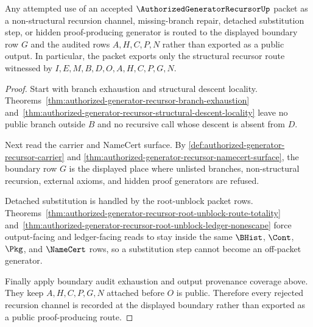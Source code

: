 \begin{theorem}
\label{thm:authorized-generator-recursor-recursion-channel-refusal}
Any attempted use of an accepted $\AuthorizedGeneratorRecursorUp$ packet as a non-structural recursion channel, missing-branch repair, detached substitution step, or hidden proof-producing generator is routed to the displayed boundary row $G$ and the audited rows $A,H,C,P,N$ rather than exported as a public output. In particular, the packet exports only the structural recursor route witnessed by $I,E,M,B,D,O,A,H,C,P,G,N$.
\end{theorem}
\begin{proof}
Start with branch exhaustion and structural descent locality. Theorems~\ref{thm:authorized-generator-recursor-branch-exhaustion} and~\ref{thm:authorized-generator-recursor-structural-descent-locality} leave no public branch outside $B$ and no recursive call whose descent is absent from $D$.

Next read the carrier and NameCert surface. By \autoref{def:authorized-generator-recursor-carrier} and \autoref{thm:authorized-generator-recursor-namecert-surface}, the boundary row $G$ is the displayed place where unlisted branches, non-structural recursion, external axioms, and hidden proof generators are refused.

Detached substitution is handled by the root-unblock packet rows. Theorems~\ref{thm:authorized-generator-recursor-root-unblock-route-totality} and~\ref{thm:authorized-generator-recursor-root-unblock-ledger-nonescape} force output-facing and ledger-facing reads to stay inside the same $\BHist$, $\Cont$, $\Pkg$, and $\NameCert$ rows, so a substitution step cannot become an off-packet generator.

Finally apply boundary audit exhaustion and output provenance coverage above. They keep $A,H,C,P,G,N$ attached before $O$ is public. Therefore every rejected recursion channel is recorded at the displayed boundary rather than exported as a public proof-producing route.
\end{proof}

